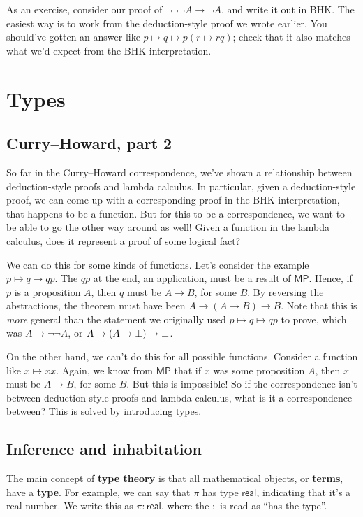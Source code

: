 \documentclass[11pt,paper=letter]{scrartcl}
\newcommand{\sf}{\mathsf}
\renewcommand{\lnot}{\neg}
\begin{document}
As an exercise, consider our proof of $\lnot\lnot\lnot A \to \lnot A$, and write it out in BHK. The easiest way is to work from the deduction-style proof we wrote earlier. You should've gotten an answer like $p \mapsto q \mapsto p(r \mapsto rq)$; check that it also matches what we'd expect from the BHK interpretation.

\clearpage

\section{Types}

\subsection{Curry--Howard, part 2}

So far in the Curry--Howard correspondence, we've shown a relationship between deduction-style proofs and lambda calculus. In particular, given a deduction-style proof, we can come up with a corresponding proof in the BHK interpretation, that happens to be a function. But for this to be a correspondence, we want to be able to go the other way around as well! Given a function in the lambda calculus, does it represent a proof of some logical fact?

We can do this for some kinds of functions. Let's consider the example $p \mapsto q \mapsto qp$. The $qp$ at the end, an application, must be a result of $\sf{MP}$. Hence, if $p$ is a proposition $A$, then $q$ must be $A \to B$, for some $B$. By reversing the abstractions, the theorem must have been $A \to (A \to B) \to B$. Note that this is \emph{more} general than the statement we originally used $p \mapsto q \mapsto qp$ to prove, which was $A \to \lnot\lnot A$, or $A \to (A \to \bot) \to \bot$.

On the other hand, we can't do this for all possible functions. Consider a function like $x \mapsto xx$. Again, we know from $\sf{MP}$ that if $x$ was some proposition $A$, then $x$ must be $A \to B$, for some $B$. But this is impossible! So if the correspondence isn't between deduction-style proofs and lambda calculus, what is it a correspondence between? This is solved by introducing types.

\subsection{Inference and inhabitation}

The main concept of \textbf{type theory} is that all mathematical objects, or \textbf{terms}, have a \textbf{type}. For example, we can say that $\pi$ has type $\sf{real}$, indicating that it's a real number. We write this as $\pi : \sf{real}$, where the $:$ is read as ``has the type''.
\end{document}
